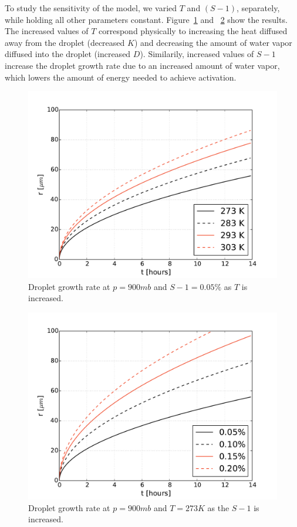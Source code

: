 \documentclass[titlepage]{article}
\begin{document}
To study the sensitivity of the model, we varied $T$ and $(S - 1)$, separately,
while holding all other parameters constant. Figure~\ref{fig:temperature} and
~\ref{fig:supersaturation} show the results. The increased values of $T$
correspond physically to increasing the heat diffused away from the droplet
(decreased $K$) and decreasing the amount of water vapor diffused into the
droplet (increased $D$).  Similarily, increased values of $S - 1$ increase the
droplet growth rate due to an increased amount of water vapor, which lowers the
amount of energy needed to achieve activation.

\begin{figure}
    \centering
    \includegraphics[width=\textwidth]{r_t_temperature.pdf}
    \caption{Droplet growth rate at $p=900 mb$ and $S - 1 = 0.05\%$ as $T$ is increased.}
    \label{fig:temperature}
\end{figure}


\begin{figure}
    \centering
    \includegraphics[width=\textwidth]{r_t_supersaturation.pdf}
    \caption{Droplet growth rate at $p=900 mb$ and $T= 273 K$ as the $S - 1$ is increased.}
    \label{fig:supersaturation}
\end{figure}
\end{document}
